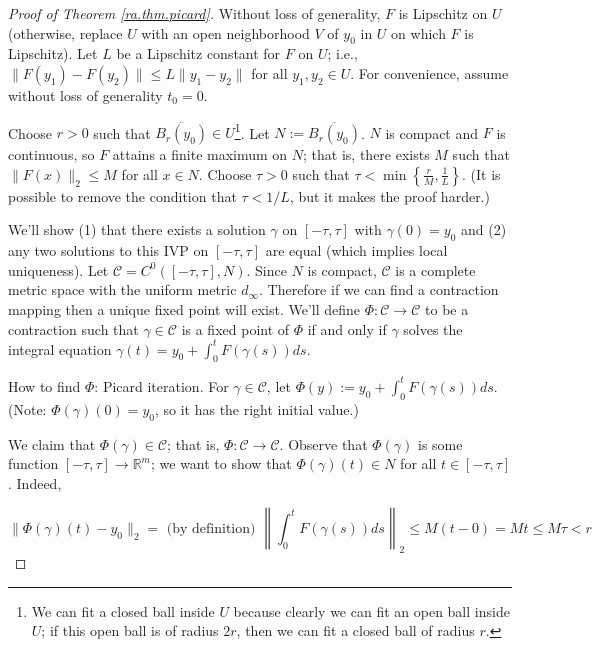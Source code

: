 \begin{proof}[Proof of Theorem \ref{ra.thm.picard}]

Without loss of generality, \(F\) is Lipschitz on \(U\) (otherwise, replace \(U\) with an open neighborhood \(V\) of \(y_0\) in \(U\) on which \(F\) is Lipschitz). Let \(L\) be a Lipschitz constant for \(F\) on \(U\); i.e., \(\lVert F(y_1) - F(y_2) \rVert \leq L \lVert y_1 - y_2 \rVert\) for all \(y_1, y_2 \in U\). For convenience, assume without loss of generality \(t_0 = 0\).

Choose \(r > 0\) such that \( \overline{B_r(y_0)} \in U\)\footnote{We can fit a closed ball inside \(U\) because clearly we can fit an open ball inside \(U\); if this open ball is of radius \(2r\), then we can fit a closed ball of radius \(r\).}. Let \(N:=  \overline{B_r(y_0)} \). \(N\) is compact and \(F\) is continuous, so \(F\) attains a finite maximum on \(N\); that is, there exists \(M\) such that \(\lVert F(x) \rVert_2 \leq M\) for all \(x \in N\). Choose \(\tau > 0\) such that \(\tau < \min \left\{ \frac{r}{M}, \frac{1}{L} \right\}\). (It is possible to remove the condition that \(\tau < 1/L\), but it makes the proof harder.)

We'll show (1) that there exists a solution \(\gamma\) on \([-\tau, \tau]\) with \(\gamma(0) = y_0\) and (2) any two solutions to this IVP on \([-\tau, \tau]\) are equal (which implies local uniqueness). Let \(\mathcal{C} = C^0([-\tau, \tau], N)\). Since \(N\) is compact, \(\mathcal{C}\) is a complete metric space with the uniform metric \(d_\infty\). Therefore if we can find a contraction mapping then a unique fixed point will exist. We'll define \(\Phi: \mathcal{C} \to \mathcal{C}\) to be a contraction such that \(\gamma \in \mathcal{C}\) is a fixed point of \(\Phi\) if and only if \(\gamma\) solves the integral equation \(\gamma(t) = y_0 + \int_0^t F(\gamma(s)) ds\). 

How to find \(\Phi\): Picard iteration. For \(\gamma \in \mathcal{C}\), let \(\Phi(y) := y_0 + \int_0^t F(\gamma(s)) ds\). (Note: \(\Phi(\gamma)(0) = y_0\), so it has the right initial value.) 

We claim that \(\Phi(\gamma) \in \mathcal{C}\); that is, \(\Phi: \mathcal{C} \to \mathcal{C}\). Observe that \(\Phi(\gamma)\) is some function \([-\tau, \tau] \to \mathbb{R}^m\); we want to show that \(\Phi(\gamma)(t) \in N\) for all \(t \in [-\tau, \tau]\). Indeed,

\[
\lVert \Phi(\gamma)(t) - y_0 \rVert_2 = \text{ (by definition) } \left\lVert \int_0^t F(\gamma(s)) ds \right\rVert_2 \leq M(t - 0) = Mt \leq M \tau < r
\] 


\end{proof}
